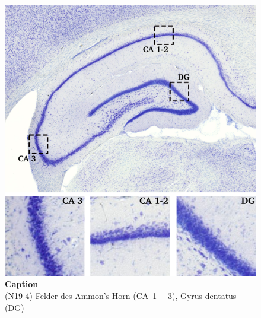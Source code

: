 \documentclass[12pt,a4paper,pdftex]{article}
\begin{document}
\begin{figure}[H]
    \centering
    \includegraphics{pictures/Basalganglia/Hippocampus.png}
    \caption[Caption]{\textbf{Caption}\\
    (N19-4)
    Felder des Ammon's Horn (CA~1~-~3), Gyrus dentatus (DG)}
    \label{fig:Hippocampus_zellschicht}
\end{figure}
\end{document}
